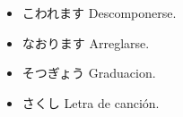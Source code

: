 \documentclass[a4paper,lualatex,ja=standard,base=10pt]{bxjsarticle}
\begin{document}
\begin{itemize}
  \item こわれます Descomponerse.
  \item なおります Arreglarse.
  \item そつぎょう Graduacion.
  \item さくし Letra de canción.
\end{itemize}

%
%
%
%
%
%
%
%
%
\end{document}

